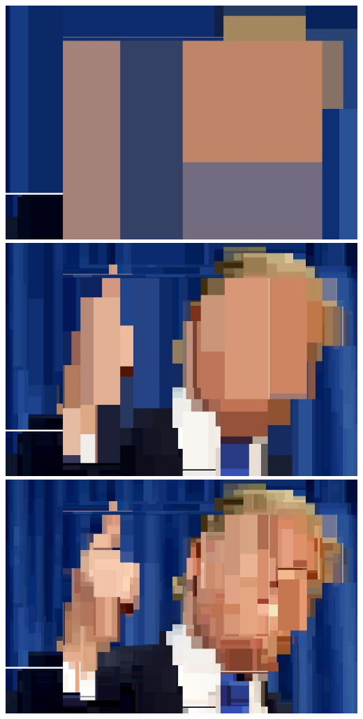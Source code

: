 \documentclass[12pt]{article}
\begin{document}
{\includegraphics[scale=0.12]{P1/RF_Trump_depth5trees1.jpg}
\includegraphics[scale=0.12]{P1/RF_Trump_depth10trees1.jpg}
\includegraphics[scale=0.12]{P1/RF_Trump_depth15trees1.jpg}

}
\end{document}
